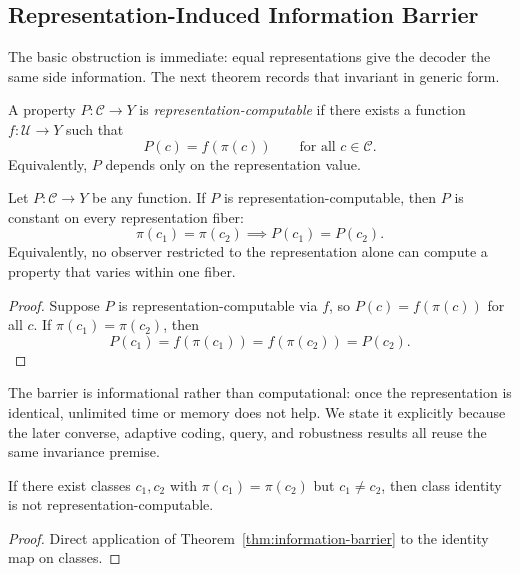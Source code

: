 \subsection{Representation-Induced Information Barrier}

The basic obstruction is immediate: equal representations give the decoder the same side information. The next theorem records that invariant in generic form.

\begin{definition}
A property $P:\mathcal C \to Y$ is \emph{representation-computable} if there exists a function $f: \mathcal U \to Y$ such that
\[
P(c) = f(\pi(c))
\qquad\text{for all } c \in \mathcal C.
\]
Equivalently, $P$ depends only on the representation value.
\end{definition}

\begin{theorem}\label{thm:information-barrier}\label{thm:info-barrier}
Let $P: \mathcal C \to Y$ be any function. If $P$ is representation-computable, then $P$ is constant on every representation fiber:
\[
\pi(c_1)=\pi(c_2) \implies P(c_1)=P(c_2).
\]
Equivalently, no observer restricted to the representation alone can compute a property that varies within one fiber.
\end{theorem}

\begin{proof}
Suppose $P$ is representation-computable via $f$, so $P(c)=f(\pi(c))$ for all $c$. If $\pi(c_1)=\pi(c_2)$, then
\[
P(c_1)=f(\pi(c_1))=f(\pi(c_2))=P(c_2).
\]
\end{proof}

\begin{remark}
The barrier is informational rather than computational: once the representation is identical, unlimited time or memory does not help. We state it explicitly because the later converse, adaptive coding, query, and robustness results all reuse the same invariance premise.
\end{remark}

\begin{corollary}\label{cor:provenance-barrier}
If there exist classes $c_1,c_2$ with $\pi(c_1)=\pi(c_2)$ but $c_1 \neq c_2$, then class identity is not representation-computable.
\end{corollary}

\begin{proof}
Direct application of Theorem~\ref{thm:information-barrier} to the identity map on classes.
\end{proof}

